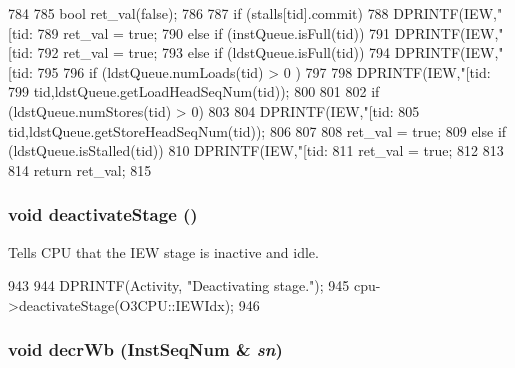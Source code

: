 \begin{DoxyCode}
784 {
785     bool ret_val(false);
786 
787     if (stalls[tid].commit) {
788         DPRINTF(IEW,"[tid:%
789         ret_val = true;
790     } else if (instQueue.isFull(tid)) {
791         DPRINTF(IEW,"[tid:%
792         ret_val = true;
793     } else if (ldstQueue.isFull(tid)) {
794         DPRINTF(IEW,"[tid:%
795 
796         if (ldstQueue.numLoads(tid) > 0 ) {
797 
798             DPRINTF(IEW,"[tid:%
799                     tid,ldstQueue.getLoadHeadSeqNum(tid));
800         }
801 
802         if (ldstQueue.numStores(tid) > 0) {
803 
804             DPRINTF(IEW,"[tid:%
805                     tid,ldstQueue.getStoreHeadSeqNum(tid));
806         }
807 
808         ret_val = true;
809     } else if (ldstQueue.isStalled(tid)) {
810         DPRINTF(IEW,"[tid:%
811         ret_val = true;
812     }
813 
814     return ret_val;
815 }
\end{DoxyCode}
\hypertarget{classDefaultIEW_aeb7184c554fd889269371c654c7efdb6}{
\subsubsection[{deactivateStage}]{\setlength{\rightskip}{0pt plus 5cm}void deactivateStage ()}}
\label{classDefaultIEW_aeb7184c554fd889269371c654c7efdb6}
Tells CPU that the IEW stage is inactive and idle. 


\begin{DoxyCode}
943 {
944     DPRINTF(Activity, "Deactivating stage.\n");
945     cpu->deactivateStage(O3CPU::IEWIdx);
946 }
\end{DoxyCode}
\hypertarget{classDefaultIEW_a108570745f0a3cc383744de3180741fe}{
\subsubsection[{decrWb}]{\setlength{\rightskip}{0pt plus 5cm}void decrWb ({\bf InstSeqNum} \& {\em sn})}}
\label{classDefaultIEW_a108570745f0a3cc383744de3180741fe}



